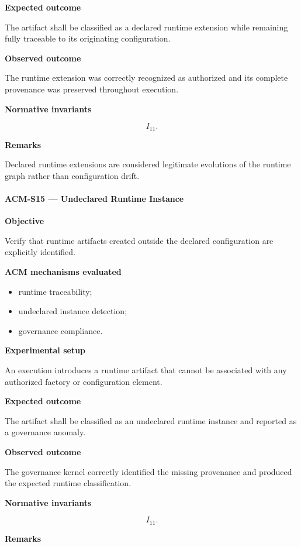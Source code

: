 \documentclass[10pt]{article}
\begin{document}
\textbf{Expected outcome}

The artifact shall be classified as a declared runtime extension while
remaining fully traceable to its originating configuration.

\textbf{Observed outcome}

The runtime extension was correctly recognized as authorized and its complete
provenance was preserved throughout execution.

\textbf{Normative invariants}

\[
I_{11}.
\]

\textbf{Remarks}

Declared runtime extensions are considered legitimate evolutions of the runtime
graph rather than configuration drift.

\paragraph{ACM-S15 --- Undeclared Runtime Instance}

\textbf{Objective}

Verify that runtime artifacts created outside the declared configuration are
explicitly identified.

\textbf{ACM mechanisms evaluated}

\begin{itemize}
    \item runtime traceability;
    \item undeclared instance detection;
    \item governance compliance.
\end{itemize}

\textbf{Experimental setup}

An execution introduces a runtime artifact that cannot be associated with any
authorized factory or configuration element.

\textbf{Expected outcome}

The artifact shall be classified as an undeclared runtime instance and reported
as a governance anomaly.

\textbf{Observed outcome}

The governance kernel correctly identified the missing provenance and produced
the expected runtime classification.

\textbf{Normative invariants}

\[
I_{11}.
\]

\textbf{Remarks}
\end{document}
